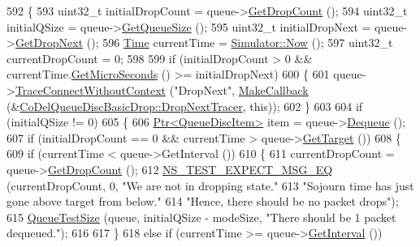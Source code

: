 \begin{DoxyCode}
592 \{
593   uint32\_t initialDropCount = queue->\hyperlink{classns3_1_1CoDelQueueDisc_a8af7efb44124c9fd4699de0d71c5a58d}{GetDropCount} ();
594   uint32\_t initialQSize = queue->\hyperlink{classns3_1_1CoDelQueueDisc_a2eed623615f381b9c377ed7add064953}{GetQueueSize} ();
595   uint32\_t initialDropNext = queue->\hyperlink{classns3_1_1CoDelQueueDisc_a0fb737d0730a5977b84f6f0d10bb28e3}{GetDropNext} ();
596   \hyperlink{classns3_1_1Time}{Time} currentTime = \hyperlink{group__simulator_gac3635e2e87f7ce316c89290ee1b01d0d}{Simulator::Now} ();
597   uint32\_t currentDropCount = 0;
598 
599   \textcolor{keywordflow}{if} (initialDropCount > 0 && currentTime.\hyperlink{classns3_1_1Time_a2542b9273c336da11fcaf54e8bc6e4c8}{GetMicroSeconds} () >= initialDropNext)
600     \{
601       queue->\hyperlink{classns3_1_1ObjectBase_a1be45f6fd561e75dcac9dfa81b2b81e4}{TraceConnectWithoutContext} (\textcolor{stringliteral}{"DropNext"}, 
      \hyperlink{group__makecallbackmemptr_ga9376283685aa99d204048d6a4b7610a4}{MakeCallback} (&\hyperlink{classCoDelQueueDiscBasicDrop_adc48228083a11737a0cd3ccf172e6c10}{CoDelQueueDiscBasicDrop::DropNextTracer}, \textcolor{keyword}{
      this}));
602     \}
603 
604   \textcolor{keywordflow}{if} (initialQSize != 0)
605     \{
606       \hyperlink{classns3_1_1Ptr}{Ptr<QueueDiscItem>} item = queue->\hyperlink{classns3_1_1QueueDisc_a6c13fc489822c1487f61c2289f2e3629}{Dequeue} ();
607       \textcolor{keywordflow}{if} (initialDropCount == 0 && currentTime > queue->\hyperlink{classns3_1_1CoDelQueueDisc_aacbaf8a85b6a82b9175db11bac44e55f}{GetTarget} ())
608         \{
609           \textcolor{keywordflow}{if} (currentTime < queue->GetInterval ())
610             \{
611               currentDropCount = queue->\hyperlink{classns3_1_1CoDelQueueDisc_a8af7efb44124c9fd4699de0d71c5a58d}{GetDropCount} ();
612               \hyperlink{group__testing_ga7304ba46a28d8cf08dfdfd6499cf7068}{NS\_TEST\_EXPECT\_MSG\_EQ} (currentDropCount, 0, \textcolor{stringliteral}{"We are not in dropping
       state."}
613                                      \textcolor{stringliteral}{"Sojourn time has just gone above target from below."}
614                                      \textcolor{stringliteral}{"Hence, there should be no packet drops"});
615               \hyperlink{classCoDelQueueDiscBasicDrop_a61137d83489ec151993b89863f9928c4}{QueueTestSize} (queue, initialQSize - modeSize, \textcolor{stringliteral}{"There should be 1 packet
       dequeued."});
616 
617             \}
618           \textcolor{keywordflow}{else} \textcolor{keywordflow}{if} (currentTime >= queue->\hyperlink{classns3_1_1CoDelQueueDisc_a8527687c2e67d2b90adb63fb5b9ce204}{GetInterval} ())

\end{DoxyCode}
